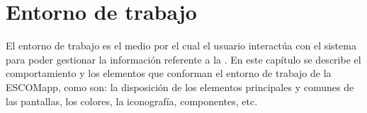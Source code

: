 
\section{Entorno de trabajo}

    El entorno de trabajo es el medio por el cual el usuario interactúa con el sistema para poder gestionar la información referente a la . En este capítulo se describe el comportamiento y los elementos que conforman el entorno de trabajo de la ESCOMapp, como son: la disposición de los elementos principales y comunes de las pantallas, los colores, la iconografía, componentes, etc. \bigskip


